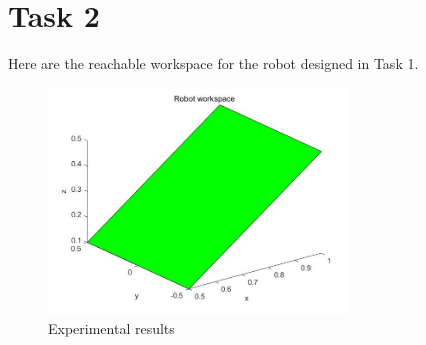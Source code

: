 \section{Task 2}
\FloatBarrier %

Here are the reachable workspace for the robot designed in Task 1.


\begin{figure}[htbp]
    \centering
    \includegraphics[width=8cm]{./fig/workspace.jpg}
    \caption{Experimental results}
    \label{f5}
\end{figure}



\newpage

